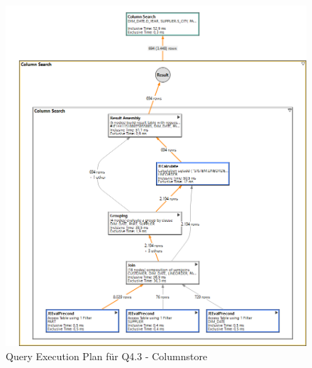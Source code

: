 \begin{figure}[H]
	\centering
	\includegraphics[scale=0.35]{images/col_q43_3}
	\caption{Query Execution Plan für Q4.3 - Columnstore \label{qepCol} }
\end{figure}

